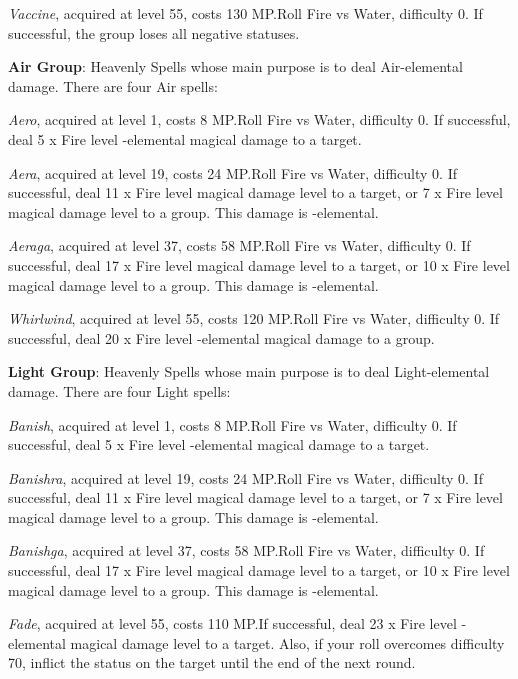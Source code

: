 \begin{multicols}{2}
    \textit{Vaccine}, acquired at level 55, costs 130 MP.\@{}Roll Fire vs Water, difficulty 0. If successful, the group loses all negative statuses.

    \textbf{Air Group}: Heavenly Spells whose main purpose is to deal Air-elemental damage. There are four Air spells:

    \textit{Aero}, acquired at level 1, costs 8 MP.\@{}Roll Fire vs Water, difficulty 0. If successful, deal 5 x Fire level -elemental magical damage to a target.

    \textit{Aera}, acquired at level 19, costs 24 MP.\@{}Roll Fire vs Water, difficulty 0. If successful, deal 11 x Fire level magical damage level to a target, or 7 x Fire level magical damage level to a group. This damage is -elemental.

    \textit{Aeraga}, acquired at level 37, costs 58 MP.\@{}Roll Fire vs Water, difficulty 0. If successful, deal 17 x Fire level magical damage level to a target, or 10 x Fire level magical damage level to a group. This damage is -elemental.

    \textit{Whirlwind}, acquired at level 55, costs 120 MP.\@{}Roll Fire vs Water, difficulty 0. If successful, deal 20 x Fire level -elemental magical damage to a group.

    \textbf{Light Group}: Heavenly Spells whose main purpose is to deal Light-elemental damage. There are four Light spells:

    \textit{Banish}, acquired at level 1, costs 8 MP.\@{}Roll Fire vs Water, difficulty 0. If successful, deal 5 x Fire level -elemental magical damage to a target.

    \textit{Banishra}, acquired at level 19, costs 24 MP.\@{}Roll Fire vs Water, difficulty 0. If successful, deal 11 x Fire level magical damage level to a target, or 7 x Fire level magical damage level to a group. This damage is -elemental.

    \textit{Banishga}, acquired at level 37, costs 58 MP.\@{}Roll Fire vs Water, difficulty 0. If successful, deal 17 x Fire level magical damage level to a target, or 10 x Fire level magical damage level to a group. This damage is -elemental.

    \textit{Fade}, acquired at level 55, costs 110 MP.\@{}If successful, deal 23 x Fire level -elemental magical damage level to a target. Also, if your roll overcomes difficulty 70, inflict the  status on the target until the end of the next round.


\end{multicols}
